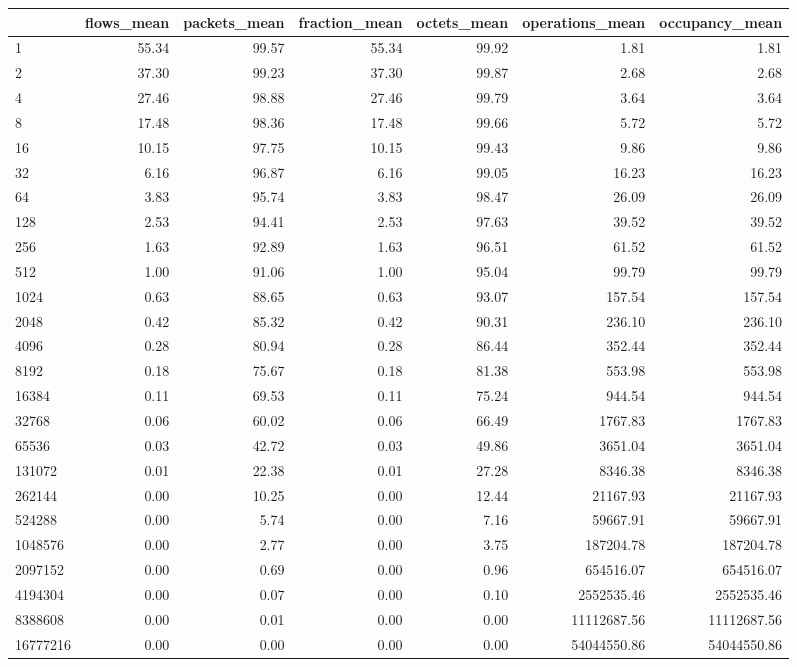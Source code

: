 \begin{tabular}{lrrrrrr}
\toprule
 & flows_mean & packets_mean & fraction_mean & octets_mean & operations_mean & occupancy_mean \\
\midrule
1 & 55.34 & 99.57 & 55.34 & 99.92 & 1.81 & 1.81 \\
2 & 37.30 & 99.23 & 37.30 & 99.87 & 2.68 & 2.68 \\
4 & 27.46 & 98.88 & 27.46 & 99.79 & 3.64 & 3.64 \\
8 & 17.48 & 98.36 & 17.48 & 99.66 & 5.72 & 5.72 \\
16 & 10.15 & 97.75 & 10.15 & 99.43 & 9.86 & 9.86 \\
32 & 6.16 & 96.87 & 6.16 & 99.05 & 16.23 & 16.23 \\
64 & 3.83 & 95.74 & 3.83 & 98.47 & 26.09 & 26.09 \\
128 & 2.53 & 94.41 & 2.53 & 97.63 & 39.52 & 39.52 \\
256 & 1.63 & 92.89 & 1.63 & 96.51 & 61.52 & 61.52 \\
512 & 1.00 & 91.06 & 1.00 & 95.04 & 99.79 & 99.79 \\
1024 & 0.63 & 88.65 & 0.63 & 93.07 & 157.54 & 157.54 \\
2048 & 0.42 & 85.32 & 0.42 & 90.31 & 236.10 & 236.10 \\
4096 & 0.28 & 80.94 & 0.28 & 86.44 & 352.44 & 352.44 \\
8192 & 0.18 & 75.67 & 0.18 & 81.38 & 553.98 & 553.98 \\
16384 & 0.11 & 69.53 & 0.11 & 75.24 & 944.54 & 944.54 \\
32768 & 0.06 & 60.02 & 0.06 & 66.49 & 1767.83 & 1767.83 \\
65536 & 0.03 & 42.72 & 0.03 & 49.86 & 3651.04 & 3651.04 \\
131072 & 0.01 & 22.38 & 0.01 & 27.28 & 8346.38 & 8346.38 \\
262144 & 0.00 & 10.25 & 0.00 & 12.44 & 21167.93 & 21167.93 \\
524288 & 0.00 & 5.74 & 0.00 & 7.16 & 59667.91 & 59667.91 \\
1048576 & 0.00 & 2.77 & 0.00 & 3.75 & 187204.78 & 187204.78 \\
2097152 & 0.00 & 0.69 & 0.00 & 0.96 & 654516.07 & 654516.07 \\
4194304 & 0.00 & 0.07 & 0.00 & 0.10 & 2552535.46 & 2552535.46 \\
8388608 & 0.00 & 0.01 & 0.00 & 0.00 & 11112687.56 & 11112687.56 \\
16777216 & 0.00 & 0.00 & 0.00 & 0.00 & 54044550.86 & 54044550.86 \\
\bottomrule
\end{tabular}
